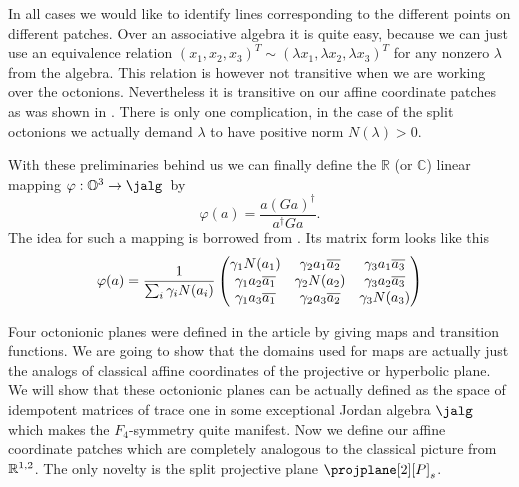 In all cases we would like to identify lines corresponding to the different points on different patches. Over an associative algebra it is quite easy, because we can just use an equivalence relation $(x_1, x_2, x_3)^T \sim  (\lambda x_1, \lambda x_2,\lambda x_3)^T$ for any nonzero $\lambda$ from the algebra. This relation is however not transitive when we are working over the octonions. Nevertheless it is transitive on our affine coordinate patches as was shown in \cite{held_semi-riemannian_2009}. There is only one complication, in the case of the split octonions we actually demand $\lambda$ to have positive norm $N(\lambda) > 0$.


With these preliminaries behind us we can finally define the $\mathbb{R}$ (or $\mathbb{C}$) linear mapping $\varphi: \octo^3 \to \jalg $\ by
\[
	\varphi(a) = \frac{a(Ga)^\dagger}{a^\dagger Ga}.
\]
The idea for such a mapping is borrowed from \cite{allcock_identifying_1997, aslaksen_restricted_1991}. Its matrix form looks like this
\begin{equation}\label{eq:varphi}
\varphi(a) = \frac{1}{\sum\nolimits_i\gamma_i N(a_i)} 
	\begin{pmatrix}
		\gamma_1 N(a_1) & \gamma_2 a_1 \overline{a_2} & \gamma_3 a_1 \overline{a_3} \\
		\gamma_1 a_2\overline{a_1} & \gamma_2 N(a_2)  & \gamma_3 a_2 \overline{a_3} \\
		\gamma_1 a_3\overline{a_1} & \gamma_2 a_3 \overline{a_2} & \gamma_3 N(a_3) \\
	\end{pmatrix}
\end{equation}

Four octonionic planes were defined in the article \cite{held_semi-riemannian_2009} by giving maps and transition functions. We are going to show that the domains used for maps are actually just the analogs of classical affine coordinates of the projective or hyperbolic plane. We will show that these octonionic planes can be actually defined as the space of idempotent matrices of trace one in some exceptional Jordan algebra $\jalg$ which makes the $F_4$-symmetry quite manifest. Now we define our affine coordinate patches which are completely analogous to the classical picture from $\mathbb{R}^{1,2}$. The only novelty is the split projective plane $\projplane[2][P]_s$.


